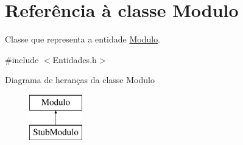 \hypertarget{class_modulo}{
\section{\-Referência à classe \-Modulo}
\label{class_modulo}
}


\-Classe que representa a entidade \hyperlink{class_modulo}{\-Modulo}.  




{\ttfamily \#include $<$\-Entidades.\-h$>$}

\-Diagrama de heranças da classe \-Modulo\begin{figure}[H]
\begin{center}
\leavevmode
\includegraphics[height=2.000000cm]{class_modulo}
\end{center}
\end{figure}
